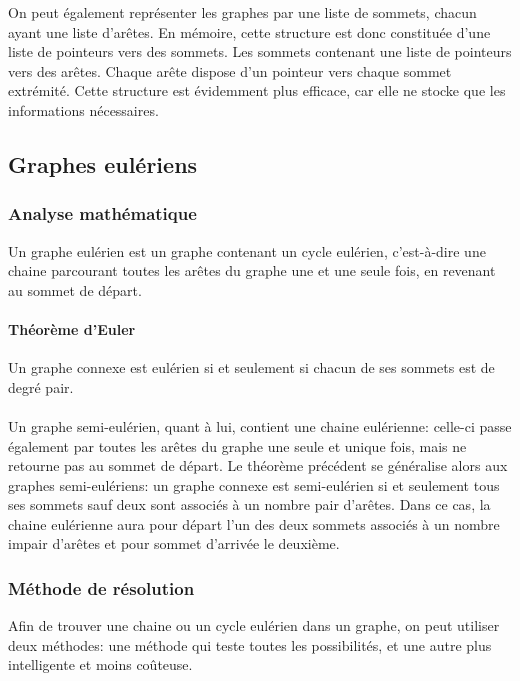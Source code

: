   On peut également représenter les graphes par une liste de sommets,
  chacun ayant une liste d'arêtes.
  En mémoire, cette structure est donc constituée d'une liste de pointeurs
  vers des sommets. Les sommets contenant une liste de pointeurs vers des
  arêtes. Chaque arête dispose d'un pointeur vers chaque sommet extrémité.
  Cette structure est évidemment plus efficace, car elle ne stocke que
  les informations nécessaires.


\subsection{Graphes eulériens}
  \subsubsection{Analyse mathématique}
    Un graphe eulérien est un graphe contenant un cycle eulérien, c'est-à-dire
    une chaine parcourant toutes les arêtes du graphe une et une seule fois, en
    revenant au sommet de départ.

    \paragraph{Théorème d'Euler} Un graphe connexe est eulérien si et seulement
    si chacun de ses sommets est de degré pair.

    \paragraph{}
    Un graphe semi-eulérien, quant à lui, contient une chaine eulérienne:
    celle-ci passe également par toutes les arêtes du graphe une seule et
    unique fois, mais ne retourne pas au sommet de départ. Le théorème précédent
    se généralise alors aux graphes semi-eulériens: un graphe connexe est
    semi-eulérien si et seulement tous ses sommets sauf deux sont associés à un
    nombre pair d'arêtes. Dans ce cas, la chaine eulérienne aura pour départ
    l'un des deux sommets associés à un nombre impair d'arêtes et pour sommet
    d'arrivée le deuxième.

  \subsubsection{Méthode de résolution}
    Afin de trouver une chaine ou un cycle eulérien dans un graphe, on peut
    utiliser deux méthodes: une méthode qui teste toutes les possibilités, et
    une autre plus intelligente et moins coûteuse.

